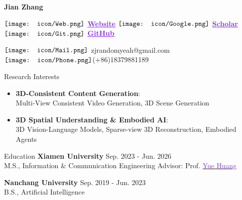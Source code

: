 \documentclass{resume} %
\newcommand*\git{\vcenter{\hbox{\texttt{[image: icon/Git.png]}}}}
\newcommand*\Google{\vcenter{\hbox{\texttt{[image: icon/Google.png]}}}}
\newcommand*\web{\vcenter{\hbox{\texttt{[image: icon/Web.png]}}}}
\newcommand*\email{\vcenter{\hbox{\texttt{[image: icon/Mail.png]}}}}
\newcommand*\phone{\vcenter{\hbox{\texttt{[image: icon/Phone.png]}}}}
\begin{document}
\begin{vwcol}[widths={0.4,0.6}, sep=.8cm, justify=flush,rule=0pt,indent=1em] 
\huge{\textbf{Jian Zhang}}

\small $\web$ \href{https://jian-zhang-3dv.github.io/}{\textcolor{BlueViolet}{\underline{\textbf{Website}}}} 
\hspace{0mm} $\Google$ \href{https://scholar.google.com/citations?user=qBNtBsAAAAAJ&hl=en&oi=sra}{\textcolor{BlueViolet}{\bf \underline{Scholar}}} \hspace{0mm} $\git$ \href{https://jian-zhang-3dv.github.io/}{\textcolor{BlueViolet}{\bf \underline{GitHub}}}

$\email$ zjrandomyeah@gmail.com \hspace{0mm} $\phone$(+86)18379881189
\end{vwcol} 

\vspace{-0.7mm}
\begin{rSection}{Research Interests}
\vspace{-1mm}
\begin{itemize}[leftmargin=1.5em, itemsep=-0.5mm]
    \item \textbf{3D-Consistent Content Generation}: 
    \\ \small Multi-View Consistent Video Generation, 3D Scene Generation
    \item \textbf{3D Spatial Understanding \& Embodied AI}: 
    \\ \small 3D Vision-Language Models, Sparse-view 3D Reconstruction, Embodied Agents
\end{itemize}
\end{rSection}

\vspace{-1.5mm}

\begin{rSection}{Education}
\vspace{-0mm}
\vspace{-1mm}
{\bf Xiamen University} \hfill Sep. 2023 - Jun. 2026
\\ M.S., Information \& Communication Engineering 
\hfill Advisor: Prof. \href{https://huangyue05.github.io/}{\textcolor{BlueViolet}{Yue Huang}}

\vspace{-1mm}
{\bf Nanchang University} \hfill Sep. 2019 - Jun. 2023
\\ B.S., Artificial Intelligence

\end{rSection}
\end{document}
